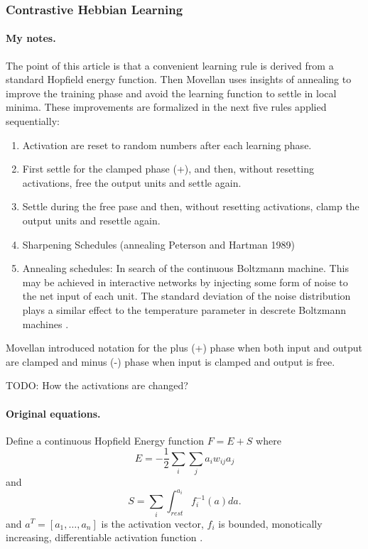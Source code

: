 \subsubsection{Contrastive Hebbian Learning}

\paragraph{My notes.}

The point of this article \cite{movellan1990contrastive} is that a convenient learning rule is derived from a standard Hopfield energy function. Then Movellan uses insights of annealing to improve the training phase and avoid the learning function to settle in local minima. These improvements are formalized in the next five rules applied sequentially:

\begin{enumerate}
\item Activation are reset to random numbers after each learning phase. 

\item First settle for the clamped phase (+), and then, without resetting activations, free the output units and settle again. 

\item Settle during the free pase and then, without resetting activations, clamp the output units and resettle again. 

\item Sharpening Schedules (annealing Peterson and Hartman 1989)

\item Annealing schedules: In search of the continuous Boltzmann machine. This may be achieved in interactive networks by injecting some form of noise to the net input of each unit. The standard deviation of the noise distribution plays a similar effect to the temperature parameter in descrete Boltzmann machines \cite{movellan1990contrastive}. 
\end{enumerate}

Movellan introduced notation for the plus (+) phase when both input and output are clamped and minus (-) phase when input is clamped and output is free. 

TODO: How the activations are changed? 

\paragraph{Original equations.}
Define a continuous Hopfield Energy function $F = E + S$ where
$$ E = -\frac{1}{2}\sum_i\sum_ja_iw_{ij}a_j$$
and 
$$ S = \sum_i \int_{rest}^{a_i} f_i^{-1}(a)da.$$
and $a^T = [a_1,\ldots,a_n]$ is the activation vector, $f_i$ is bounded, monotically increasing, differentiable activation function \cite{movellan1990contrastive}.

